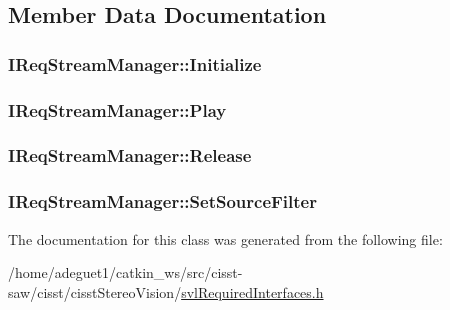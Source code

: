 \subsection{Member Data Documentation}
\hypertarget{class_i_req_stream_manager_ae9d510716e9fefb79d95a727ac939f86}{
\subsubsection[{Initialize}]{ I\-Req\-Stream\-Manager\-::\-Initialize}}\label{class_i_req_stream_manager_ae9d510716e9fefb79d95a727ac939f86}
\hypertarget{class_i_req_stream_manager_ad11164304990fd48f0e5ffb2fc3a75cf}{
\subsubsection[{Play}]{ I\-Req\-Stream\-Manager\-::\-Play}}\label{class_i_req_stream_manager_ad11164304990fd48f0e5ffb2fc3a75cf}
\hypertarget{class_i_req_stream_manager_a2f12fc26563af9bb3e035f7758cee301}{
\subsubsection[{Release}]{ I\-Req\-Stream\-Manager\-::\-Release}}\label{class_i_req_stream_manager_a2f12fc26563af9bb3e035f7758cee301}
\hypertarget{class_i_req_stream_manager_a1574c68fc18c8006f65360a0f7022e53}{
\subsubsection[{Set\-Source\-Filter}]{ I\-Req\-Stream\-Manager\-::\-Set\-Source\-Filter}}\label{class_i_req_stream_manager_a1574c68fc18c8006f65360a0f7022e53}


The documentation for this class was generated from the following file\-:\begin{DoxyCompactItemize}
\item 
/home/adeguet1/catkin\-\_\-ws/src/cisst-\/saw/cisst/cisst\-Stereo\-Vision/\hyperlink{svl_required_interfaces_8h}{svl\-Required\-Interfaces.\-h}\end{DoxyCompactItemize}
